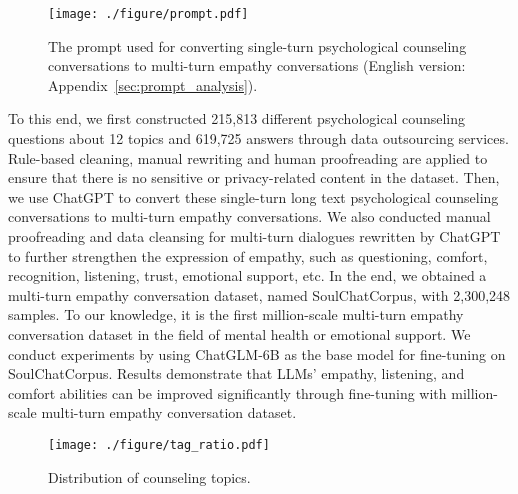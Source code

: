 \documentclass[11pt]{article}
\begin{document}
\begin{figure}[htbp]
  \centering
  \texttt{[image: ./figure/prompt.pdf]}
  \caption{The prompt used for converting single-turn psychological counseling conversations to multi-turn empathy conversations (English version: Appendix~\ref{sec:prompt_analysis}). 
}
  \label{prompt}
\end{figure}


To this end, we first constructed 215,813 different psychological counseling questions about 12 topics and 619,725 answers through data outsourcing services. Rule-based cleaning, manual rewriting and human proofreading are applied to ensure that there is no sensitive or privacy-related content in the dataset. Then, we use ChatGPT to convert these single-turn long text psychological counseling conversations to multi-turn empathy conversations. We also conducted manual proofreading and data cleansing for multi-turn dialogues rewritten by ChatGPT to further strengthen the expression of empathy, such as questioning, comfort, recognition, listening, trust, emotional support, etc. In the end, we obtained a  multi-turn empathy conversation dataset, named SoulChatCorpus, with 2,300,248 samples. To our knowledge, it is the first million-scale multi-turn empathy conversation dataset in the field of mental health or emotional support. We conduct experiments by using ChatGLM-6B as the base model for fine-tuning on SoulChatCorpus. Results demonstrate that LLMs' empathy, listening, and comfort abilities can be improved significantly through fine-tuning with million-scale multi-turn empathy conversation dataset.

%

\begin{figure}[htbp]
  \centering
  \texttt{[image: ./figure/tag\_ratio.pdf]}
  \caption{Distribution of counseling topics.
}
  \label{tag_ratio}
\end{figure}
\end{document}
